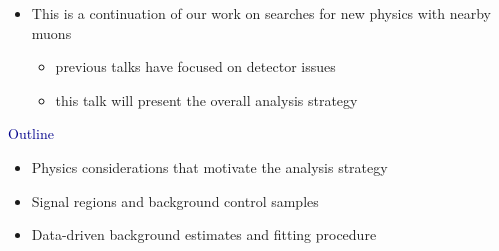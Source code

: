 \documentclass[compress]{beamer}
\begin{document}
\begin{frame}
\begin{itemize}\setlength{\itemsep}{0.75 cm}
\item This is a continuation of our work on searches for new physics with nearby muons
\begin{itemize}
\item previous talks have focused on detector issues
\item this talk will present the overall analysis strategy
\end{itemize}
\end{itemize}

\vfill
\hspace{-0.83 cm} \textcolor{darkblue}{\Large Outline}

\vspace{0.2 cm}
\begin{itemize}
\item Physics considerations that motivate the analysis strategy
\item Signal regions and background control samples
\item Data-driven background estimates and fitting procedure
\end{itemize}
\end{frame}
\end{document}
